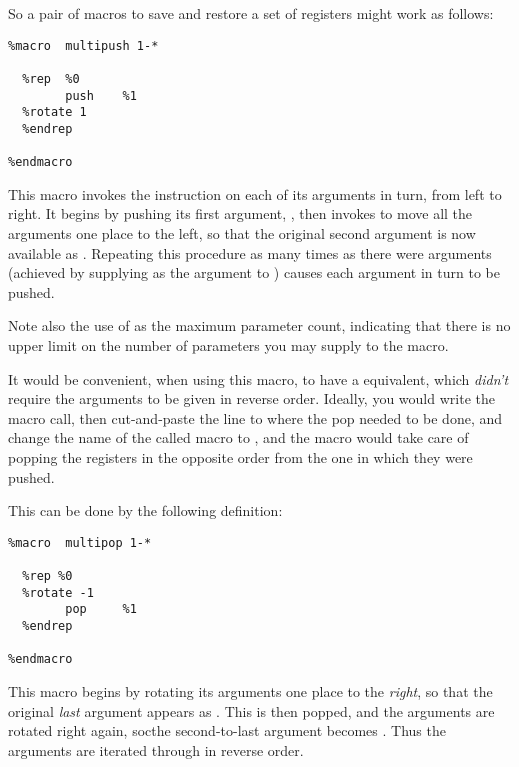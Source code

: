 So a pair of macros to save and
restore a set of registers might work as follows:

\begin{lstlisting}
%macro  multipush 1-*

  %rep  %0
        push    %1
  %rotate 1
  %endrep

%endmacro
\end{lstlisting}

This macro invokes the  instruction on each of its arguments
in turn, from left to right. It begins by pushing its first
argument, , then invokes  to move all the arguments
one place to the left, so that the original second argument is now
available as . Repeating this procedure as many times as there
were arguments (achieved by supplying  as the argument to
) causes each argument in turn to be pushed.

Note also the use of \code{*} as the maximum parameter count,
indicating that there is no upper limit on the number of parameters
you may supply to the  macro.

It would be convenient, when using this macro, to have a 
equivalent, which \emph{didn't} require the arguments to be given in
reverse order. Ideally, you would write the  macro
call, then cut-and-paste the line to where the pop needed to be
done, and change the name of the called macro to , and
the macro would take care of popping the registers in the opposite
order from the one in which they were pushed.

This can be done by the following definition:

\begin{lstlisting}
%macro  multipop 1-*

  %rep %0
  %rotate -1
        pop     %1
  %endrep

%endmacro
\end{lstlisting}

This macro begins by rotating its arguments one place to the
\emph{right}, so that the original \emph{last} argument appears
as . This is then popped, and the arguments are rotated
right again, socthe second-to-last argument becomes .
Thus the arguments are iterated through in reverse order.
